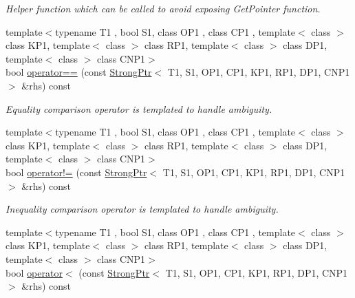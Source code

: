 \begin{DoxyCompactItemize}
\begin{DoxyCompactList}\small\item\em Helper function which can be called to avoid exposing Get\+Pointer function. \end{DoxyCompactList}\item 
\hypertarget{classLoki_1_1StrongPtr_ae68b771e1d0838209f26f6e3f431ed2a}{}{\footnotesize template$<$typename T1 , bool S1, class O\+P1 , class C\+P1 , template$<$ class $>$ class K\+P1, template$<$ class $>$ class R\+P1, template$<$ class $>$ class D\+P1, template$<$ class $>$ class C\+N\+P1$>$ }\\bool \hyperlink{classLoki_1_1StrongPtr_ae68b771e1d0838209f26f6e3f431ed2a}{operator==} (const \hyperlink{classLoki_1_1StrongPtr}{Strong\+Ptr}$<$ T1, S1, O\+P1, C\+P1, K\+P1, R\+P1, D\+P1, C\+N\+P1 $>$ \&rhs) const \label{classLoki_1_1StrongPtr_ae68b771e1d0838209f26f6e3f431ed2a}

\begin{DoxyCompactList}\small\item\em Equality comparison operator is templated to handle ambiguity. \end{DoxyCompactList}\item 
\hypertarget{classLoki_1_1StrongPtr_aaa579970568df7b4391c955ada8c8da5}{}{\footnotesize template$<$typename T1 , bool S1, class O\+P1 , class C\+P1 , template$<$ class $>$ class K\+P1, template$<$ class $>$ class R\+P1, template$<$ class $>$ class D\+P1, template$<$ class $>$ class C\+N\+P1$>$ }\\bool \hyperlink{classLoki_1_1StrongPtr_aaa579970568df7b4391c955ada8c8da5}{operator!=} (const \hyperlink{classLoki_1_1StrongPtr}{Strong\+Ptr}$<$ T1, S1, O\+P1, C\+P1, K\+P1, R\+P1, D\+P1, C\+N\+P1 $>$ \&rhs) const \label{classLoki_1_1StrongPtr_aaa579970568df7b4391c955ada8c8da5}

\begin{DoxyCompactList}\small\item\em Inequality comparison operator is templated to handle ambiguity. \end{DoxyCompactList}\item 
\hypertarget{classLoki_1_1StrongPtr_acd0da9edf4630309c2c910877aa5e2fb}{}{\footnotesize template$<$typename T1 , bool S1, class O\+P1 , class C\+P1 , template$<$ class $>$ class K\+P1, template$<$ class $>$ class R\+P1, template$<$ class $>$ class D\+P1, template$<$ class $>$ class C\+N\+P1$>$ }\\bool \hyperlink{classLoki_1_1StrongPtr_acd0da9edf4630309c2c910877aa5e2fb}{operator$<$} (const \hyperlink{classLoki_1_1StrongPtr}{Strong\+Ptr}$<$ T1, S1, O\+P1, C\+P1, K\+P1, R\+P1, D\+P1, C\+N\+P1 $>$ \&rhs) const \label{classLoki_1_1StrongPtr_acd0da9edf4630309c2c910877aa5e2fb}


\end{DoxyCompactItemize}
